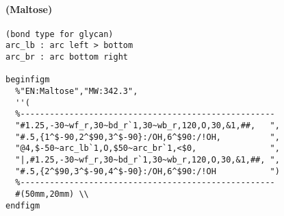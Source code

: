 \documentclass[a4paper]{article}
\begin{document}
\paragraph{(Maltose)}
\begin{verbatim}
(bond type for glycan)
arc_lb : arc left > bottom
arc_br : arc bottom right

beginfigm
  %"EN:Maltose","MW:342.3",
  ''(
  %----------------------------------------------------
  "#1.25,-30~wf_r,30~bd_r`1,30~wb_r,120,O,30,&1,##,   ",
  "#.5,{1^$-90,2^$90,3^$-90}:/OH,6^$90:/!OH,          ",
  "@4,$-50~arc_lb`1,O,$50~arc_br`1,<$0,               ",
  "|,#1.25,-30~wf_r,30~bd_r`1,30~wb_r,120,O,30,&1,##, ",
  "#.5,{2^$90,3^$-90,4^$-90}:/OH,6^$90:/!OH           ")
  %----------------------------------------------------
  #(50mm,20mm) \\
endfigm
\end{verbatim}
\newpage
\end{document}
